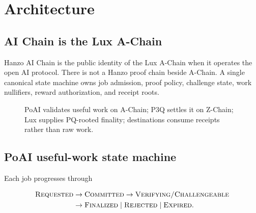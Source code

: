 \section{Architecture}
\label{sec:arch}

\subsection{AI Chain is the Lux A-Chain}

Hanzo AI Chain is the public identity of the Lux A-Chain when it operates the
open AI protocol. There is not a Hanzo proof chain beside A-Chain. A single
canonical state machine owns job admission, proof policy, challenge state, work
nullifiers, reward authorization, and receipt roots.

\begin{figure}[h]
\centering
{}
\caption{PoAI validates useful work on A-Chain; P3Q settles it on Z-Chain; Lux
supplies PQ-rooted finality; destinations consume receipts rather than raw work.}
\label{fig:arch}
\end{figure}

\subsection{PoAI useful-work state machine}

Each job progresses through

\begin{equation}
\begin{aligned}
\textsc{Requested}&\rightarrow\textsc{Committed}
\rightarrow\textsc{Verifying/Challengeable}\\
&\rightarrow\textsc{Finalized}\;|\;\textsc{Rejected}\;|\;\textsc{Expired}.
\end{aligned}
\end{equation}

